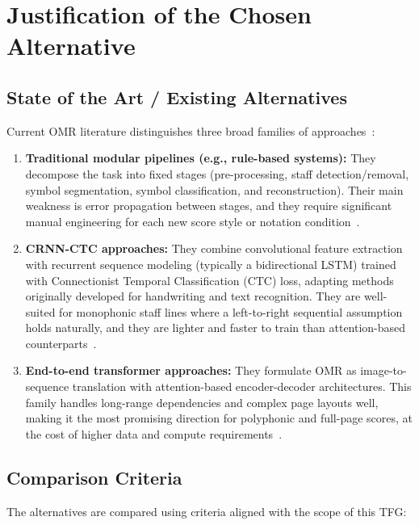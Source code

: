 \documentclass[11pt, a4paper]{article}
\begin{document}
\section{Justification of the Chosen Alternative}

\subsection{State of the Art / Existing Alternatives}
Current OMR literature distinguishes three broad families of approaches~\cite{shatriOPTICALMUSICRECOGNITION}:

\begin{enumerate}
    \item \textbf{Traditional modular pipelines (e.g., rule-based systems):} They decompose the task into fixed stages (pre-processing, staff detection/removal, symbol segmentation, symbol classification, and reconstruction). Their main weakness is error propagation between stages, and they require significant manual engineering for each new score style or notation condition~\cite{dalitzComparativeStudyStaff2008}.
    \item \textbf{CRNN-CTC approaches:} They combine convolutional feature extraction with recurrent sequence modeling (typically a bidirectional LSTM) trained with Connectionist Temporal Classification (CTC) loss, adapting methods originally developed for handwriting and text recognition. They are well-suited for monophonic staff lines where a left-to-right sequential assumption holds naturally, and they are lighter and faster to train than attention-based counterparts~\cite{PrIMuSDataset,opticalmusicrecognitionresearchSelfLearningOpticalMusic2019,simonettaOpticalMusicRecognition2024}.
    \item \textbf{End-to-end transformer approaches:} They formulate OMR as image-to-sequence translation with attention-based encoder-decoder architectures. This family handles long-range dependencies and complex page layouts well, making it the most promising direction for polyphonic and full-page scores, at the cost of higher data and compute requirements~\cite{vilaAntoniorv6SMT2026,UfalOlimpicicdar24Practical,simonettaOpticalMusicRecognition2024}.
\end{enumerate}

\subsection{Comparison Criteria}
\label{sec:criteria}
The alternatives are compared using criteria aligned with the scope of this TFG:
\end{document}

